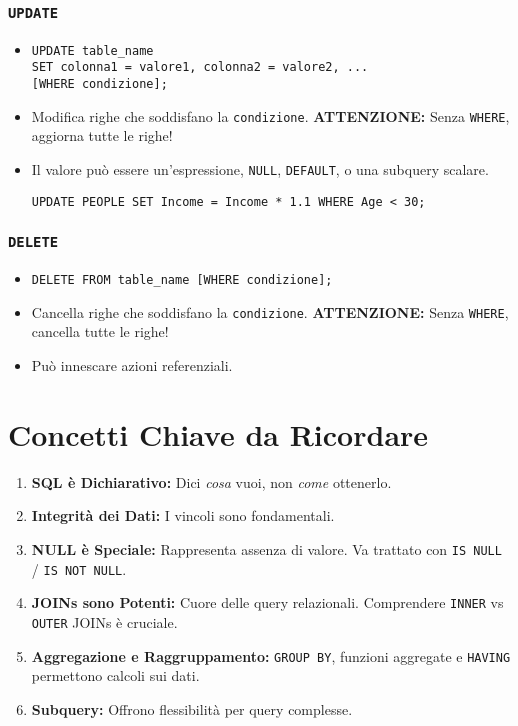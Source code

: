 \subsubsection{\texttt{UPDATE}}
\begin{itemize}
	\item
	\begin{verbatim}
UPDATE table_name
SET colonna1 = valore1, colonna2 = valore2, ...
[WHERE condizione];
	\end{verbatim}
	\item Modifica righe che soddisfano la \texttt{condizione}. \textbf{ATTENZIONE:} Senza \texttt{WHERE}, aggiorna tutte le righe!
	\item Il valore può essere un'espressione, \texttt{NULL}, \texttt{DEFAULT}, o una subquery scalare.
	\begin{verbatim}
UPDATE PEOPLE SET Income = Income * 1.1 WHERE Age < 30;
	\end{verbatim}
\end{itemize}

\subsubsection{\texttt{DELETE}}
\begin{itemize}
	\item
	\begin{verbatim}
DELETE FROM table_name [WHERE condizione];
	\end{verbatim}
	\item Cancella righe che soddisfano la \texttt{condizione}. \textbf{ATTENZIONE:} Senza \texttt{WHERE}, cancella tutte le righe!
	\item Può innescare azioni referenziali.
\end{itemize}

\section{Concetti Chiave da Ricordare}
\begin{enumerate}
	\item \textbf{SQL è Dichiarativo:} Dici \textit{cosa} vuoi, non \textit{come} ottenerlo.
	\item \textbf{Integrità dei Dati:} I vincoli sono fondamentali.
	\item \textbf{NULL è Speciale:} Rappresenta assenza di valore. Va trattato con \texttt{IS NULL} / \texttt{IS NOT NULL}.
	\item \textbf{JOINs sono Potenti:} Cuore delle query relazionali. Comprendere \texttt{INNER} vs \texttt{OUTER} JOINs è cruciale.
	\item \textbf{Aggregazione e Raggruppamento:} \texttt{GROUP BY}, funzioni aggregate e \texttt{HAVING} permettono calcoli sui dati.
	\item \textbf{Subquery:} Offrono flessibilità per query complesse.
\end{enumerate}

